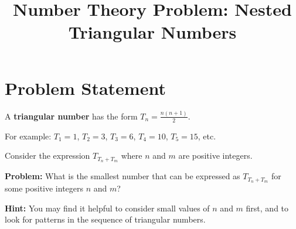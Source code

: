 \documentclass[12pt]{article}
\title{Number Theory Problem: Nested Triangular Numbers}
\author{}
\date{}
\begin{document}
\maketitle

\section*{Problem Statement}

A \textbf{triangular number} has the form $T_n = \frac{n(n+1)}{2}$.

For example: $T_1 = 1$, $T_2 = 3$, $T_3 = 6$, $T_4 = 10$, $T_5 = 15$, etc.

Consider the expression $T_{T_n + T_m}$ where $n$ and $m$ are positive integers.

\textbf{Problem:} What is the smallest number that can be expressed as $T_{T_n + T_m}$ for some positive integers $n$ and $m$?

\vspace{0.5cm}

\textbf{Hint:} You may find it helpful to consider small values of $n$ and $m$ first, and to look for patterns in the sequence of triangular numbers.
\end{document}
